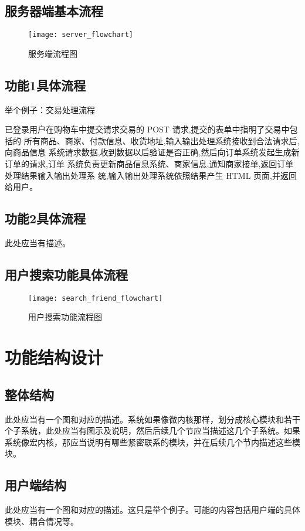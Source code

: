\subsection{服务器端基本流程}
\begin{figure}[h]
	\centering
	\texttt{[image: server\_flowchart]}
	\caption{服务端流程图} \label{fig:server_flowchart}
\end{figure}

\subsection{功能1具体流程}
举个例子：交易处理流程

已登录用户在购物车中提交请求交易的 POST 请求,提交的表单中指明了交易中包括的
所有商品、商家、付款信息、收货地址,输入输出处理系统接收到合法请求后,向商品信息
系统请求数据,收到数据以后验证是否正确,然后向订单系统发起生成新订单的请求,订单
系统负责更新商品信息系统、商家信息,通知商家接单,返回订单处理结果输入输出处理系
统,输入输出处理系统依照结果产生 HTML 页面,并返回给用户。

\subsection{功能2具体流程}
此处应当有描述。

\subsection{用户搜索功能具体流程}
\begin{figure}[h]
	\centering
	\texttt{[image: search\_friend\_flowchart]}
	\caption{用户搜索功能流程图} \label{fig:search_friend_flowchart}
\end{figure}


\section{功能结构设计}
\subsection{整体结构}
此处应当有一个图和对应的描述。系统如果像微内核那样，划分成核心模块和若干个子系统，此处应当有图示及说明，然后后续几个节应当描述这几个子系统。如果系统像宏内核，那应当说明有哪些紧密联系的模块，并在后续几个节内描述这些模块。

\subsection{用户端结构}
此处应当有一个图和对应的描述。这只是举个例子。可能的内容包括用户端的具体模块、耦合情况等。

